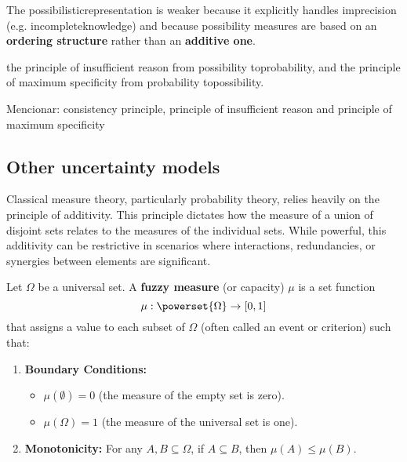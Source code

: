 {The possibilisticrepresentation is weaker because it explicitly handles imprecision (e.g. incompleteknowledge) and because possibility measures are based on an \textbf{ordering structure} rather than an \textbf{additive one}.

the principle of insufficient reason from possibility toprobability, and the principle of maximum specificity from probability topossibility.

Mencionar: consistency principle, principle of insufficient reason and principle of maximum specificity
}


\subsection{Other uncertainty models}







Classical measure theory, particularly probability theory, relies heavily on the principle of additivity. This principle dictates how the measure of a union of disjoint sets relates to the measures of the individual sets. While powerful, this additivity can be restrictive in scenarios where interactions, redundancies, or synergies between elements are significant.

\begin{definition}
Let $\Omega$ be a universal set. A \textbf{fuzzy measure} (or capacity) $\mu$ is a set function
\[ \mu: \powerset{\Omega} \to [0, 1] \]
that assigns a value to each subset of $\Omega$ (often called an event or criterion) such that:
\begin{enumerate}
    \item \textbf{Boundary Conditions:}
    \begin{itemize}
        \item $\mu(\emptyset) = 0$ (the measure of the empty set is zero).
        \item $\mu(\Omega) = 1$ (the measure of the universal set is one).
    \end{itemize}
    \item \textbf{Monotonicity:} For any $A, B \subseteq \Omega$, if $A \subseteq B$, then $\mu(A) \le \mu(B)$.
\end{enumerate}
\end{definition}

